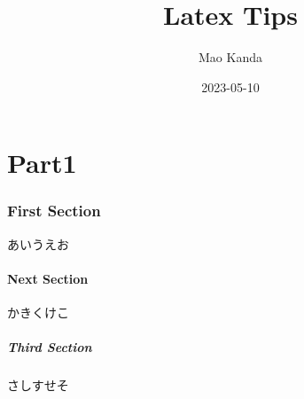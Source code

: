 \documentclass{jsarticle}
\title{Latex Tips}
\author{Mao Kanda}
\date{2023-05-10}
\begin{document}
    \maketitle
    \part{Part1}

    \section{First Section}
    あいうえお

    \subsection{Next Section}
    かきくけこ

    \subsubsection{Third Section}
    さしすせそ

\end{document}
